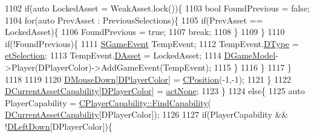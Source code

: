 \begin{DoxyCode}
1102                         \textcolor{keywordflow}{if}(\textcolor{keyword}{auto} LockedAsset = WeakAsset.lock())\{
1103                             \textcolor{keywordtype}{bool} FoundPrevious = \textcolor{keyword}{false};
1104                             \textcolor{keywordflow}{for}(\textcolor{keyword}{auto} PrevAsset : PreviousSelections)\{
1105                                 \textcolor{keywordflow}{if}(PrevAsset == LockedAsset)\{
1106                                     FoundPrevious = \textcolor{keyword}{true};
1107                                     \textcolor{keywordflow}{break};
1108                                 \}
1109                             \}
1110                             \textcolor{keywordflow}{if}(!FoundPrevious)\{
1111                                 \hyperlink{structSGameEvent}{SGameEvent} TempEvent;
1112                                 TempEvent.\hyperlink{structSGameEvent_afa10562e243f4ac2b473b655cc58fee7}{DType} = \hyperlink{GameModel_8h_abfcf510bafec7c6429906a6ecaac656da38393c2ecd9404ab15f2f9bb5aab0497}{etSelection};
1113                                 TempEvent.\hyperlink{structSGameEvent_a40c85eeac83b96887b7449c9bdc5d624}{DAsset} = LockedAsset;
1114                                 \hyperlink{classCApplicationData_a32b50c7c1cbac3cfd67c7f775b1d6fee}{DGameModel}->Player(DPlayerColor)->AddGameEvent(TempEvent);
1115                             \}
1116                         \}
1117                     \}
1118                     
1119                 
1120                     \hyperlink{classCApplicationData_ad7a43a29e7906e44f09347850796a915}{DMouseDown}[\hyperlink{classCApplicationData_a53550939b20cba70570f113e4d1c5d02}{DPlayerColor}] = \hyperlink{classCPosition}{CPosition}(-1,-1);
1121                 \}
1122                 \hyperlink{classCApplicationData_a7e0dbfdc54f73dfa9838ae81b8017e2d}{DCurrentAssetCapability}[\hyperlink{classCApplicationData_a53550939b20cba70570f113e4d1c5d02}{DPlayerColor}] = 
      \hyperlink{GameDataTypes_8h_a35b98ce26aca678b03c6f9f76e4778ceaa8df154ad276f6f62054e9b5b0696f92}{actNone};
1123             \}
1124             \textcolor{keywordflow}{else}\{
1125                 \textcolor{keyword}{auto} PlayerCapability = \hyperlink{classCPlayerCapability_a881ba4b87385d7cfe5cb6ced2d26f226}{CPlayerCapability::FindCapability}(
      \hyperlink{classCApplicationData_a7e0dbfdc54f73dfa9838ae81b8017e2d}{DCurrentAssetCapability}[DPlayerColor]); 
1126                 
1127                 \textcolor{keywordflow}{if}(PlayerCapability && !\hyperlink{classCApplicationData_a2b943f18557c3e4c8cd4550e22e028b6}{DLeftDown}[DPlayerColor])\{

\end{DoxyCode}
